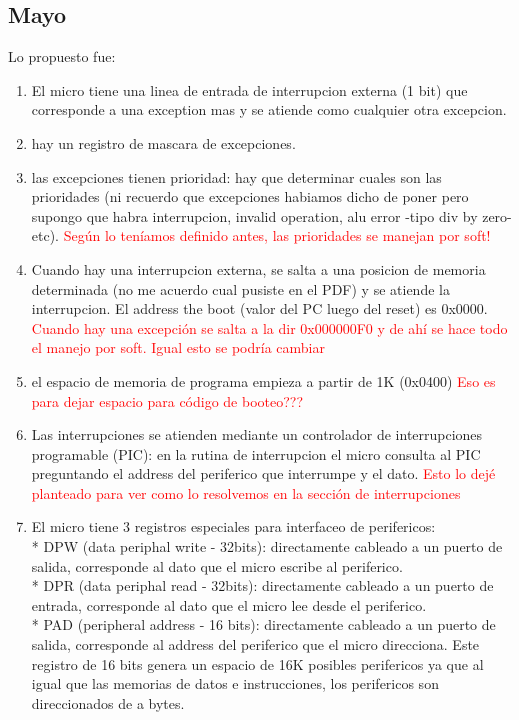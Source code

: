 \subsection{Mayo}
Lo propuesto fue:
\begin{enumerate}
  \item El micro tiene una linea de entrada de interrupcion externa (1 bit) que corresponde a una exception mas y se atiende como cualquier otra excepcion.
  \item hay un registro de mascara de excepciones.
  \item las excepciones tienen prioridad: hay que determinar cuales son las prioridades (ni recuerdo que excepciones habiamos dicho de poner pero supongo que habra interrupcion, invalid operation, alu error -tipo div by zero- etc).
	\textcolor{red}{Según lo teníamos definido antes, las prioridades se manejan por soft!}
  \item Cuando hay una interrupcion externa, se salta a una posicion de memoria determinada (no me acuerdo cual pusiste en el PDF) y se atiende la interrupcion. El address the boot (valor del PC luego del reset) es 0x0000.
        \textcolor{red}{Cuando hay una excepción se salta a la dir 0x000000F0 y de ahí se hace todo el manejo por soft. Igual esto se podría cambiar}
  \item el espacio de memoria de programa empieza a partir de 1K (0x0400) \textcolor{red}{Eso es para dejar espacio para código de booteo???}
  \item Las interrupciones se atienden mediante un controlador de interrupciones programable (PIC): en la rutina de interrupcion el micro consulta al PIC preguntando el address del periferico que interrumpe y el dato.
        \textcolor{red}{Esto lo dejé planteado para ver como lo resolvemos en la sección de interrupciones}
  \item El micro tiene 3 registros especiales para interfaceo de perifericos:\\
      * DPW (data periphal write - 32bits): directamente cableado a un puerto de salida, corresponde al dato que el micro escribe al periferico.\\
      * DPR (data periphal read - 32bits): directamente cableado a un puerto de entrada, corresponde al dato que el micro lee desde el periferico.\\
      * PAD (peripheral address - 16 bits): directamente cableado a un puerto de salida, corresponde al address del periferico que el micro direcciona. Este registro de 16 bits genera un espacio de 16K posibles perifericos ya que al igual que las memorias de datos e instrucciones, los perifericos son direccionados de a bytes.\\

\end{enumerate}
